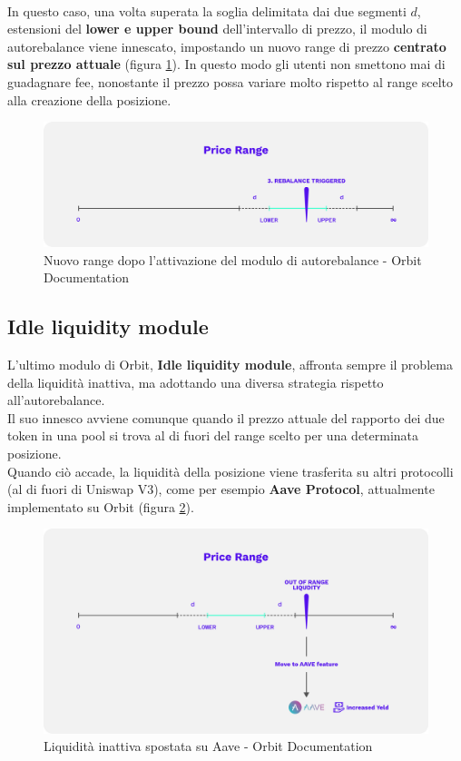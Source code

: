 \documentclass[12pt,a4paper]{report}
\begin{document}
\noindent \\In questo caso, una volta superata la soglia delimitata dai due segmenti $d$, estensioni del \textbf{lower e upper bound} dell'intervallo di prezzo, il modulo di autorebalance viene innescato, impostando un nuovo range di prezzo \textbf{centrato sul prezzo attuale} (figura \ref{fig:new_range}).
In questo modo gli utenti non smettono mai di guadagnare fee, nonostante il prezzo possa variare molto rispetto al range scelto alla creazione della posizione.

\begin{figure}[H]
  \includegraphics[scale=0.3]{new_range.png}
  \centering
  \caption{Nuovo range dopo l'attivazione del modulo di autorebalance - Orbit Documentation}
  \label{fig:new_range}
\end{figure}

\subsection{Idle liquidity module}

L'ultimo modulo di Orbit, \textbf{Idle liquidity module}, affronta sempre il problema della liquidità inattiva, ma adottando una diversa strategia rispetto all'autorebalance.
\\Il suo innesco avviene comunque quando il prezzo attuale del rapporto dei due token in una pool si trova al di fuori del range scelto per una determinata posizione. \\Quando ciò accade, la liquidità della posizione viene trasferita su altri protocolli (al di fuori di Uniswap V3), come per esempio \textbf{Aave Protocol}, attualmente implementato su Orbit (figura \ref{fig:aave}).

\begin{figure}[H]
  \includegraphics[scale=0.3]{aave.png}
  \centering
  \caption{Liquidità inattiva spostata su Aave - Orbit Documentation}
  \label{fig:aave}
\end{figure}
\end{document}

